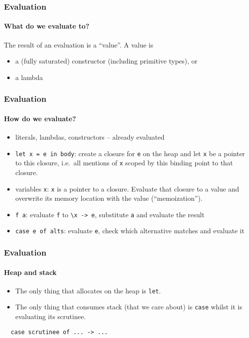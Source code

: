 \documentclass{beamer}
\begin{document}
\begin{frame}
\frametitle{Evaluation}
\framesubtitle{What do we evaluate to?}

The result of an evaluation is a ``value''.  A value is

\begin{itemize}
\item a (fully saturated) constructor (including primitive types), or
\item a lambda
\end{itemize}

\end{frame}

\begin{frame}[fragile]
  \frametitle{Evaluation}
  \framesubtitle{How do we evaluate?}

  \begin{itemize}
  \item literals, lambdas, constructors -- already evaluated

  \item \verb+let x = e in body+: create a closure for \verb+e+ on the
    heap and let \verb+x+ be a pointer to this closure, i.e.\ all
    mentions of \verb+x+ scoped by this binding point to that closure.

  \item variables \verb+x+: \verb+x+ is a pointer to a closure.
    Evaluate that closure to a value and overwrite its memory location
    with the value (``memoization'').

  \item \verb+f a+: evaluate \verb+f+ to \verb+\x -> e+, substitute
    \verb+a+ and evaluate the result

  \item \verb+case e of alts+: evaluate \verb+e+, check which
    alternative matches and evaluate it

  \end{itemize}

\end{frame}

\begin{frame}[fragile]
  \frametitle{Evaluation}
  \framesubtitle{Heap and stack}

  \begin{itemize}
  \item The only thing that allocates on the heap is \verb+let+.

  \item The only thing that consumes stack (that we care about) is
    \verb+case+ whilst it is evaluating its scrutinee.
  \end{itemize}

  \begin{verbatim}
  case scrutinee of ... -> ...
  \end{verbatim}

\end{frame}
\end{document}
